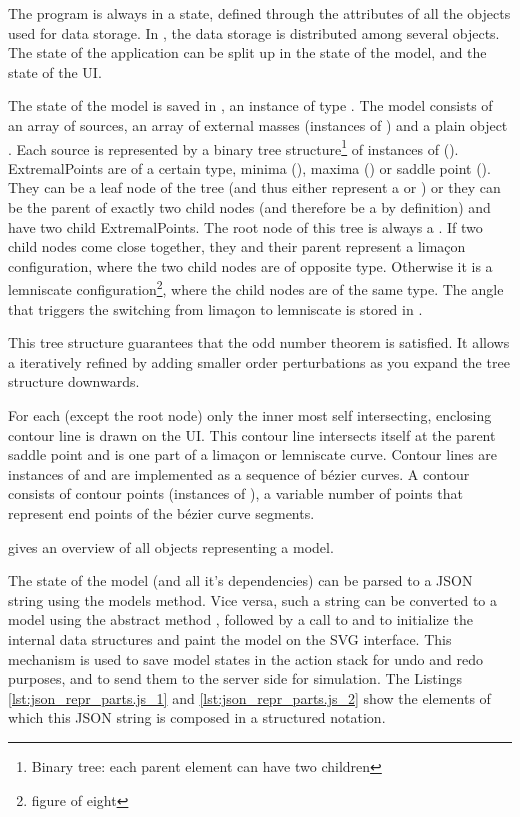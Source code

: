 The program is always in a state, defined through the attributes of all the objects used for data storage.
In \spl, the data storage is distributed among several objects.
The state of the application can be split up in the state of the model, and the state of the UI.

The state of the model is saved in , an instance of type .
The model  consists of an array of sources, an array of external masses (instances of ) and a plain object .
Each source is represented by a binary tree structure\footnote{Binary tree: each parent element can have two children} of instances of  ().
ExtremalPoints are of a certain type, minima (), maxima () or saddle point ().
They can be a leaf node of the tree (and thus either represent a  or ) or they can be the parent of exactly two child nodes (and therefore be a  by definition) and have two child ExtremalPoints.
The root node of this tree is always a .
If two child nodes come close together, they and their parent represent a limaçon configuration, where the two child nodes are of opposite type.
Otherwise it is a lemniscate configuration\footnote{figure of eight}, where the child nodes are of the same type.
The angle that triggers the switching from limaçon to lemniscate is stored in .

This tree structure guarantees that the odd number theorem is satisfied.
It allows a iteratively refined by adding smaller order perturbations as you expand the tree structure downwards.


For each  (except the root node) only the inner most self intersecting, enclosing contour line is drawn on the UI.
This contour line intersects itself at the parent saddle point and is one part of a limaçon or lemniscate curve.
Contour lines are instances of  and are implemented as a sequence of bézier curves.
A contour consists of contour points (instances of ), a variable number of points that represent end points of the bézier curve segments.

 gives an overview of all objects representing a model.

The state of the model (and all it's dependencies) can be parsed to a JSON string using the models  method.
Vice versa, such a string can be converted to a model using the abstract method , followed by a call to  and  to initialize the internal data structures and paint the model on the SVG interface.
This mechanism is used to save model states in the action stack for undo and redo purposes, and to send them to the server side for simulation.
The Listings \ref{lst:json_repr_parts.js_1} and \ref{lst:json_repr_parts.js_2} show the elements of which this JSON string is composed in a structured notation.

